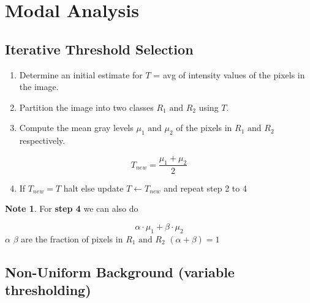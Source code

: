 \documentclass[11pt]{article}
\theoremstyle{definition}
\newtheorem*{unnote}{Note}  %
\begin{document}

\newpage
\section{Modal Analysis}


\subsection{Iterative Threshold Selection}

\begin{enumerate}
    \item Determine an initial estimate for $T$ = avg of intensity values of the pixels in the image.
    
    \item Partition the image into two classes $R_1 \text{ and } R_2$ using $T$.
    
    \item Compute the mean gray levels $\mu_1 \text{ and } \mu_2$ of the pixels in 
    $R_1 \text{ and } R_2$ respectively.
\end{enumerate}

\begin{shaded}
\[
T_{new} = \frac{\mu_1 + \mu_2}{2}
\]
\end{shaded}

\begin{enumerate}
    \setcounter{enumi}{3}
    \item If $T_{new} = T$ halt else update $T \longleftarrow T_{new}$ and repeat step 2 to 4
\end{enumerate}

\begin{unnote}
    For \textbf{step 4} we can also do
\end{unnote}

\[
\alpha \cdot \mu_1 + \beta \cdot \mu_2
\]
 $\alpha$  $\beta$ are the fraction of pixels in  
$R_1 \text{ and } R_2$ $(\alpha + \beta) = 1$


\subsection{Non-Uniform Background (variable thresholding)}
\end{document}
